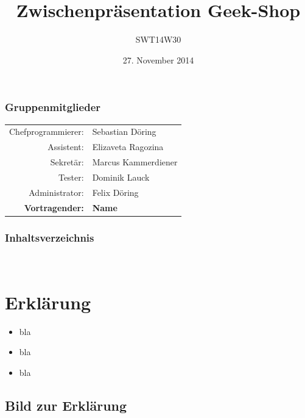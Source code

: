\documentclass{beamer}
\begin{document}
\title{Zwischenpr\"asentation Geek-Shop}
\author{SWT14W30}
\date{27. November 2014}

\begin{frame}
\titlepage
\end{frame}

\begin{frame}
\frametitle{Gruppenmitglieder}
\begin{tabular}{rp{10cm}}
Chefprogrammierer: & Sebastian Döring \\
Assistent: & Elizaveta Ragozina \\
Sekretär: & Marcus Kammerdiener \\
Tester: & Dominik Lauck \\
Administrator: & Felix Döring \\[.5cm]
\textbf{Vortragender:} & \textbf{Name}\\
\end{tabular}

\end{frame}


\begin{frame}
\frametitle{Inhaltsverzeichnis}\
\tableofcontents
\end{frame}

\section{Erkl\"arung}
\begin{frame}
\begin{itemize}
\item bla
\item bla
\item bla
\end{itemize}
\end{frame}

\subsection{Bild zur Erkl\"arung}
\begin{frame}
\end{frame}
\end{document}
